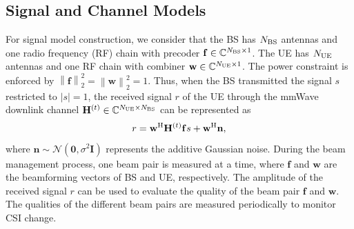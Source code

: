 \documentclass[journal,12pt,onecolumn,draftclsnofoot,]{IEEEtran}
\begin{document}
\subsection{Signal and Channel Models}
\vspace{-1.5mm}
For signal model construction, we consider that the BS has $N_{{\rm BS}}$ antennas and one radio frequency (RF) chain with precoder ${\mathbf{f}} \in {\mathbb{C}^{{N_{{\rm BS}}} \times {1}}}$. The UE has $N_{{\rm UE}}$ antennas and one RF chain with combiner ${\mathbf{w}} \in {\mathbb{C}^{{N_{{\rm UE}}} \times {1}}}$. The power constraint is enforced by ${\left\|{\mathbf{f}}\right\|}_2^2={\left\|{\mathbf{w}}\right\|}_2^2=1$.
Thus, when the BS transmitted {\color{black}the signal ${ s}$ restricted to $\left|{ s}\right|=1$}, the received signal ${ r}$ of the UE through the mmWave downlink channel ${\mathbf{H}^{(t)}} \in {\mathbb{C}^{{N_{\rm UE}} \times {{N_{\rm BS}}}}}$ can be represented as
\vspace{-2mm}
\begin{equation}
{ r}= { {\mathbf{w}} ^{\rm H}}{\mathbf{H}^{(t)}} {\mathbf{f}}{ s} + { {\mathbf{w}} ^{\rm{H}}}\mathbf{n},
\end{equation}
where $\mathbf{n} \sim {\mathcal{N}(\mathbf{0},\sigma^2 \mathbf{I})}$ represents the additive Gaussian noise. 
During the beam management process, one beam pair is measured at a time, where $\mathbf{f}$ and $\mathbf{w}$ are the beamforming vectors of BS and UE, respectively. 
The amplitude of the received signal ${r}$ can be used to evaluate the quality of the beam pair $\mathbf{f}$ and $\mathbf{w}$. The qualities of the different beam pairs are measured periodically to monitor CSI change.
\end{document}
